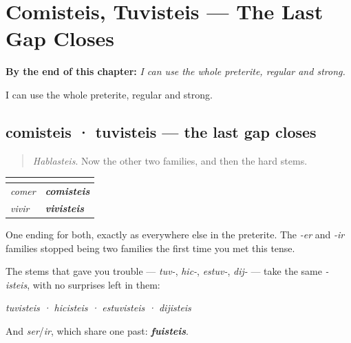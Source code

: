 
\chapter{Comisteis, Tuvisteis --- The Last Gap Closes}
\label{ch:comisteis}

\begin{chapteropening}
\textbf{By the end of this chapter:} \emph{I can use the whole preterite, regular and strong.}

I can use the whole preterite, regular and strong.
\end{chapteropening}

\section[comisteis · tuvisteis]{comisteis · tuvisteis — the last gap closes}

\label{lesson:ES-C63-comisteis}



\begin{quote}
\emph{Hablasteis}. Now the other two families, and then the hard stems.
\end{quote}

\begin{grammarlens}[title={Grammar Lens: -isteis, for everything else}]
\noindent
\begin{tabularx}{\linewidth}{@{}>{\raggedright\arraybackslash}X>{\raggedright\arraybackslash}X@{}}
\toprule
\textbf{} & \textbf{} \\
\midrule
\emph{comer} & \emph{\textbf{comisteis}} \\
\emph{vivir} & \emph{\textbf{vivisteis}} \\
\bottomrule
\end{tabularx}

One ending for both, exactly as everywhere else in the preterite. The \emph{-er} and \emph{-ir} families stopped being two families the first time you met this tense.
\end{grammarlens}

\begin{grammarlens}[title={Grammar Lens: and the strong stems take it too}]
The stems that gave you trouble — \emph{tuv-}, \emph{hic-}, \emph{estuv-}, \emph{dij-} — take the same \emph{-isteis}, with no surprises left in them:

\emph{tuvisteis · hicisteis · estuvisteis · dijisteis}

And \emph{ser}/\emph{ir}, which share one past: \emph{\textbf{fuisteis}}.
\end{grammarlens}

